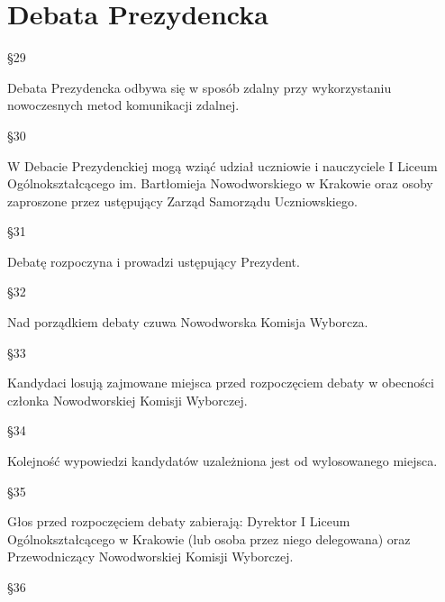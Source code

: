 \documentclass[12pt]{article}
\begin{document}
\section{Debata Prezydencka}
    \begin{center}
        \S 29\\
    \end{center}
    Debata Prezydencka odbywa się w sposób zdalny  przy wykorzystaniu nowoczesnych metod komunikacji zdalnej.\\
    \begin{center}
        \S 30\\
    \end{center}
    W Debacie Prezydenckiej mogą wziąć udział uczniowie i nauczyciele I Liceum Ogólnokształcącego im. Bartłomieja Nowodworskiego w Krakowie oraz osoby zaproszone przez ustępujący Zarząd Samorządu Uczniowskiego.\\
    \begin{center}
        \S 31\\
    \end{center}
    Debatę rozpoczyna i prowadzi ustępujący Prezydent.\\
    \begin{center}
        \S 32\\
    \end{center}
     Nad porządkiem debaty czuwa Nowodworska Komisja Wyborcza.\\
    \begin{center}
        \S 33\\
    \end{center}
    Kandydaci losują zajmowane miejsca przed rozpoczęciem debaty w obecności członka Nowodworskiej Komisji Wyborczej.\\
    \begin{center}
        \S 34\\
    \end{center}
    Kolejność wypowiedzi kandydatów uzależniona jest od wylosowanego miejsca.\\
    \begin{center}
        \S 35\\
    \end{center}
    Głos przed rozpoczęciem debaty zabierają: Dyrektor I Liceum Ogólnokształcącego w Krakowie (lub osoba przez niego delegowana) oraz Przewodniczący Nowodworskiej Komisji Wyborczej.
    \begin{center}
        \S 36\\
    \end{center}
\end{document}
